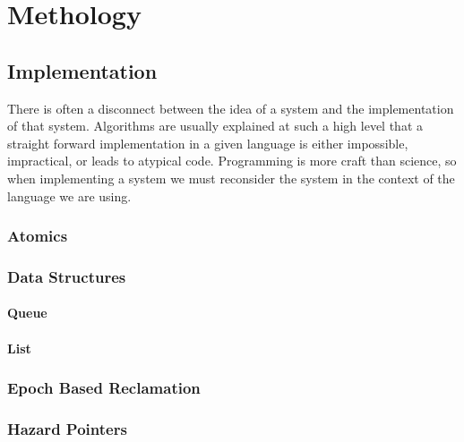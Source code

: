 \documentclass[b5paper,twoside]{report}
\begin{document}
\chapter{Methology}

\section{Implementation}
There is often a disconnect between the idea of a system and the implementation
of that system.  Algorithms are usually explained at such a high level that a
straight forward implementation in a given language is either impossible,
impractical, or leads to atypical code.  Programming is more craft than
science, so when implementing a system we must reconsider the system in the
context of the language we are using.


\subsection{Atomics}

\subsection{Data Structures}

\subsubsection{Queue}

\subsubsection{List}

\subsection{Epoch Based Reclamation}

\subsection{Hazard Pointers}
\end{document}
